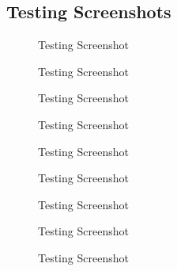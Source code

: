 \documentclass[a4paper, 11pt]{article}
\begin{document}
\begin{appendix}

\section{Testing Screenshots}

\begin{multicols}{2}

\begin{figure}[H]
\centering
\caption{Testing Screenshot}
\label{CreatorScreenshot1}
\end{figure}

\begin{figure}[H]
\centering
\caption{Testing Screenshot}
\label{CreatorScreenshot2}
\end{figure}

\begin{figure}[H]
\centering
\caption{Testing Screenshot}
\label{CreatorScreenshot3}
\end{figure}

\begin{figure}[H]
\centering
\caption{Testing Screenshot}
\label{CreatorScreenshot4}
\end{figure}

\begin{figure}[H]
\centering
\caption{Testing Screenshot}
\label{CreatorScreenshot5}
\end{figure}

\begin{figure}[H]
\centering
\caption{Testing Screenshot}
\label{CreatorScreenshot6}
\end{figure}

\begin{figure}[H]
\centering
\caption{Testing Screenshot}
\label{CreatorScreenshot7}
\end{figure}

\begin{figure}[H]
\centering
\caption{Testing Screenshot}
\label{CreatorScreenshot8}
\end{figure}

\begin{figure}[H]
\centering
\caption{Testing Screenshot}
\label{CreatorScreenshot9}
\end{figure}


\end{multicols}
\end{appendix}
\end{document}
